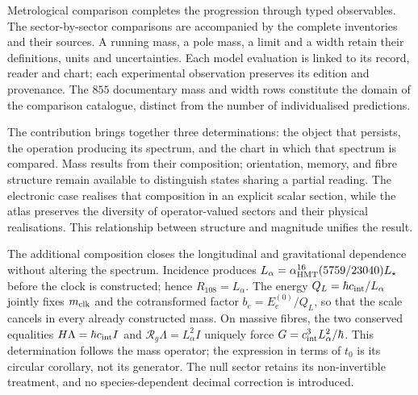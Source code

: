 Metrological comparison completes the progression through typed
observables. The sector-by-sector comparisons are accompanied by
the complete inventories and their sources. A running mass, a pole
mass, a limit and a width retain their definitions, units
and uncertainties. Each model evaluation is linked to its record,
reader and chart; each experimental observation preserves its edition
and provenance. The \(855\) documentary mass and width rows
constitute the domain of the comparison catalogue, distinct from the number
of individualised predictions.

The contribution brings together three determinations: the object that
persists, the operation producing its spectrum, and the chart in which
that spectrum is compared. Mass results from their composition;
orientation, memory, and fibre structure remain available to distinguish
states sharing a partial reading. The electronic case realises that
composition in an explicit scalar section, while the atlas preserves the
diversity of operator-valued sectors and their physical realisations.
This relationship between structure and magnitude unifies the result.

\par
The additional composition closes the longitudinal and gravitational
dependence without altering the spectrum. Incidence produces
\(L_\alpha=\alpha_{\rm HMT}^{16}(5759/23040)L_\star\) before the clock
is constructed; hence \(R_{108}=L_\alpha\). The energy
\(Q_L=\hbar c_{\rm int}/L_\alpha\) jointly fixes
\(m_{\rm clk}\) and the cotransformed factor
\(b_e=E_e^{(0)}/Q_L\), so that the scale cancels in every already
constructed mass. On massive fibres, the two conserved equalities
\(H\Lambda=\hbar c_{\rm int}I\) and
\(\mathcal R_g\Lambda=L_\alpha^2I\) uniquely force
\(G=c_{\rm int}^3L_\alpha^2/\hbar\). This determination follows the
mass operator; the expression in terms of \(t_0\) is its circular
corollary, not its generator. The null sector retains its non-invertible
treatment, and no species-dependent decimal correction is introduced.
